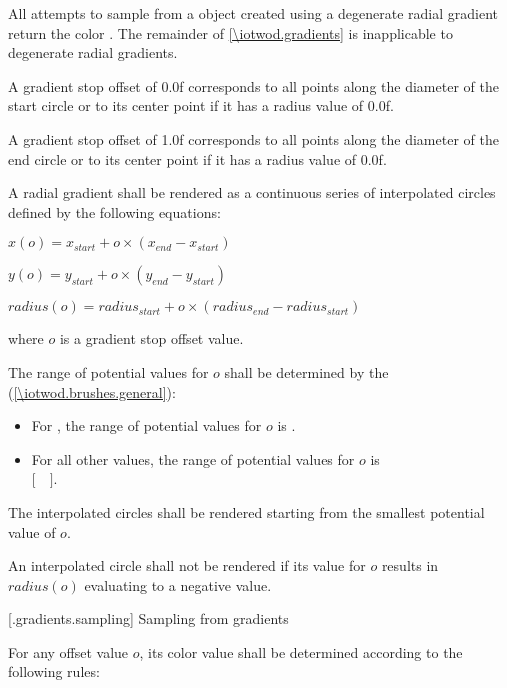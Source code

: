 \pnum
All attempts to sample from a  object created using a degenerate radial gradient return the color . The remainder of \ref{\iotwod.gradients} is inapplicable to degenerate radial gradients.

\pnum
A gradient stop offset of 0.0f corresponds to all points along the diameter of the start circle or to its center point if it has a radius value of 0.0f.

\pnum
A gradient stop offset of 1.0f corresponds to all points along the diameter of the end circle or to its center point if it has a radius value of 0.0f.

\pnum
A radial gradient shall be rendered as a continuous series of interpolated circles defined by the following equations:
\begin{enumeratea}
\item $x(o) = x_{start} + o \times (x_{end} - x_{start})$
\item $y(o) = y_{start} + o \times (y_{end} - y_{start})$
\item $radius(o) = radius_{start} + o \times (radius_{end} - radius_{start})$
\end{enumeratea}
where $o$ is a gradient stop offset value.

\pnum
The range of potential values for $o$ shall be determined by the  (\ref{\iotwod.brushes.general}):
\begin{itemize}
\item For , the range of potential values for $o$ is .
\item For all other  values, the range of potential values for $o$ is\\ $[$~~$]$.
\end{itemize}

\pnum
The interpolated circles shall be rendered starting from the smallest potential value of $o$.

\pnum
An interpolated circle shall not be rendered if its value for $o$ results in $radius(o)$ evaluating to a negative value.

 [\iotwod.gradients.sampling] {Sampling from gradients}

\pnum
For any offset value $o$, its color value shall be determined according to the following rules:

